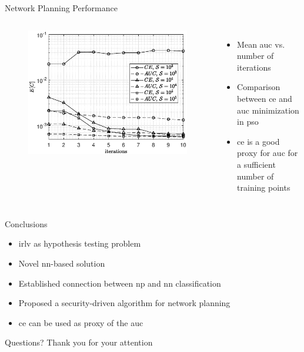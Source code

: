 \documentclass[10pt]{beamer}
\begin{document}
\begin{frame}{Network Planning Performance}
\begin{columns}
\begin{figure} 
\centering
\includegraphics[width=1\columnwidth]{res_PSO_comp.eps}
\end{figure}
\begin{itemize}
\item Mean \ac{auc} vs. number of iterations
\item Comparison between \ac{ce} and \ac{auc} minimization in \ac{pso}
\item \ac{ce} is a good proxy for \ac{auc} for a sufficient number of training points
\end{itemize}
\end{columns}
\end{frame}

\begin{frame}{Conclusions}
\begin{itemize}
\item \ac{irlv} as hypothesis testing problem
\item Novel \ac{nn}-based solution
\item Established connection between \ac{np} and \ac{nn} classification
\item Proposed a security-driven algorithm for network planning
\item \ac{ce} can be used as proxy of the \ac{auc}
\end{itemize}
\end{frame}

\begin{frame}{Questions?}
	Thank you for your attention
\end{frame}
\end{document}
